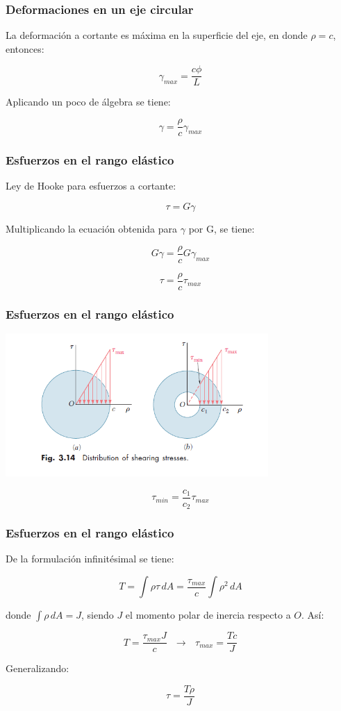 \documentclass{beamer}
\begin{document}
\begin{frame}
\justifying
\frametitle{Deformaciones en un eje circular}

La deformación a cortante es máxima en la superficie del eje, en donde $\rho = c$, entonces:

$$ \gamma_{max} = \frac{c\phi}{L} $$

Aplicando un poco de álgebra se tiene:

$$ \gamma = \frac{\rho}{c} \gamma_{max} $$

\end{frame}


\begin{frame}
\justifying
\frametitle{Esfuerzos en el rango elástico}

Ley de Hooke para esfuerzos a cortante:

$$\tau = G \gamma $$

Multiplicando la ecuación obtenida para $\gamma$ por G, se tiene:

$$ G\gamma = \frac{\rho}{c} G \gamma_{max} $$

$$ \tau = \frac{\rho}{c} \tau_{max} $$

\end{frame}


\begin{frame}
\justifying
\frametitle{Esfuerzos en el rango elástico}

\begin{center}
\includegraphics[width=0.75\textwidth]{img/stress_distribution.PNG}
\end{center}

$$ \tau_{min} = \frac{c_1}{c_2} \tau_{max} $$

\end{frame}


\begin{frame}
\justifying
\frametitle{Esfuerzos en el rango elástico}

De la formulación infinitésimal se tiene:

$$ T = \int \rho \tau \, dA = \frac{\tau_{max}}{c} \int \rho^2 \, dA $$

donde $\int \rho \, dA = J$, siendo $J$ el momento polar de inercia respecto a $O$. Así:

$$ T = \frac{\tau_{max} J}{c}  \,\,\,\, \rightarrow \,\,\,\, \tau_{max} = \frac{Tc}{J} $$

Generalizando:

$$ \tau = \frac{T\rho}{J} $$

\end{frame}
\end{document}
